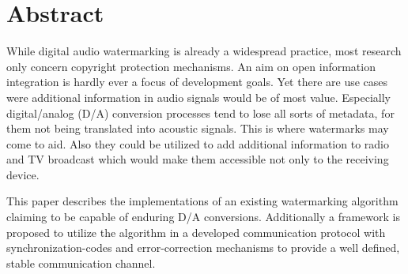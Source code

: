 \chapter*{Abstract}

While digital audio watermarking is already a widespread practice, most research only concern copyright protection mechanisms. An aim on open information integration is hardly ever a focus of development goals. Yet there are use cases were additional information in audio signals would be of most value. Especially digital/analog (D/A) conversion processes tend to lose all sorts of metadata, for them not being translated into acoustic signals.
This is where watermarks may come to aid. Also they could be utilized to add additional information to radio and TV broadcast which would make them accessible not only to the receiving device.

This paper describes the implementations of an existing watermarking algorithm claiming to be capable of enduring D/A conversions. Additionally a framework is proposed to utilize the algorithm in a developed communication protocol with synchronization-codes and error-correction mechanisms to provide a well defined, stable communication channel.

